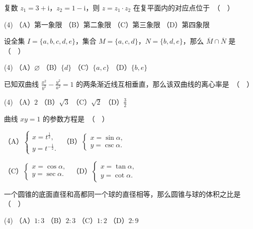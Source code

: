 \begin{question}
复数 $z_1 = 3 + \mathrm{i}$，$z_2 = 1 - \mathrm{i}$，则 $z = z_1 \cdot z_2$ 在复平面内的对应点位于　（　）

\begin{gkopts}(4)
\task （A）第一象限
\task （B）第二象限
\task （C）第三象限
\task （D）第四象限
\end{gkopts}

\end{question}
\begin{question}
设全集 $I = \{a, b, c, d, e\}$，集合 $M = \{a, c, d\}$，$N = \{b, d, e\}$，那么 $\overline{M} \cap \overline{N}$ 是　（　）

\begin{gkopts}(4)
\task （A）$\varnothing$
\task （B）$\{d\}$
\task （C）$\{a, c\}$
\task （D）$\{b, e\}$
\end{gkopts}

\end{question}
\begin{question}
已知双曲线 $\frac{x^2}{b^2} - \frac{y^2}{a^2} = 1$ 的两条渐近线互相垂直，那么该双曲线的离心率是　（　）

\begin{gkopts}(4)
\task （A）$2$
\task （B）$\sqrt{3}$
\task （C）$\sqrt{2}$
\task （D）$\frac{3}{2}$
\end{gkopts}

\end{question}
\begin{question}
曲线 $xy = 1$ 的参数方程是　（　）

（A）$\begin{cases} x = t^{\frac{1}{2}}, \\ y = t^{-\frac{1}{2}}. \end{cases}$　（B）$\begin{cases} x = \sin\alpha, \\ y = \csc\alpha. \end{cases}$

（C）$\begin{cases} x = \cos\alpha, \\ y = \sec\alpha. \end{cases}$　（D）$\begin{cases} x = \tan\alpha, \\ y = \cot\alpha. \end{cases}$

\end{question}
\begin{question}
一个圆锥的底面直径和高都同一个球的直径相等，那么圆锥与球的体积之比是　（　）

\begin{gkopts}(4)
\task （A）$1:3$
\task （B）$2:3$
\task （C）$1:2$
\task （D）$2:9$
\end{gkopts}

\end{question}
